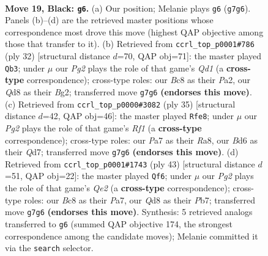 \documentclass[11pt]{article}
\begin{document}
\clearpage

\begin{figure}[p]\centering
\begin{subfigure}{0.46\textwidth}\centering
\resizebox{\linewidth}{!}{%
\newchessgame
\chessboard[
  setfen={r1bq1rk1/pp4pp/3b1p2/3p4/5n1P/1B1P1N2/PPPB1PP1/R2QR1K1 b - - 0 19},
  showmover=false,
  pgfstyle=straightmove, color=movearrow, markmove={g7-g6}
]}
\caption{}
\end{subfigure}\hfill
\begin{subfigure}{0.46\textwidth}\centering
\resizebox{\linewidth}{!}{%
\newchessgame
\chessboard[
  setfen={2rqr1k1/p4pp1/1b3n2/1p1pNb1p/3P4/4B1P1/PP3PBP/R2Q1RK1 w - - 0 17},
  showmover=false,
  pgfstyle=straightmove, color=movearrow, markmove={d1-b3}
]}
\caption{}
\end{subfigure}
\\[4pt]
\begin{subfigure}{0.46\textwidth}\centering
\resizebox{\linewidth}{!}{%
\newchessgame
\chessboard[
  setfen={r4rk1/1pbq2pp/p1n1bp2/3p4/B2P4/P1B2N1P/1P3PP1/2RQR1K1 b - - 0 18},
  showmover=false,
  pgfstyle=straightmove, color=movearrow, markmove={f8-e8}
]}
\caption{}
\end{subfigure}\hfill
\begin{subfigure}{0.46\textwidth}\centering
\resizebox{\linewidth}{!}{%
\newchessgame
\chessboard[
  setfen={r3r1k1/pp2qpbb/3p3p/2pPn3/2P2B2/2N4P/PP1QB1P1/2R2RK1 b - - 4 22},
  showmover=false,
  pgfstyle=straightmove, color=movearrow, markmove={e7-f6}
]}
\caption{}
\end{subfigure}
\caption{\textbf{Move 19, Black: \texttt{g6}.} (a) Our position; Melanie plays \texttt{g6} (\texttt{g7g6}). Panels (b)--(d) are the retrieved master positions whose correspondence most drove this move (highest QAP objective among those that transfer to it). (b) Retrieved from \texttt{ccrl\_top\_p0001\#786} (ply 32) [structural distance $d$=70, QAP obj=71]: the master played \texttt{Qb3}; under $\mu$ our \emph{Pg2} plays the role of that game's \emph{Qd1} (a \textbf{cross-type} correspondence); cross-type roles: our \emph{B}c8 as their \emph{P}a2, our \emph{Q}d8 as their \emph{B}g2; transferred move \texttt{g7g6} \textbf{(endorses this move)}. (c) Retrieved from \texttt{ccrl\_top\_p0000\#3082} (ply 35) [structural distance $d$=42, QAP obj=46]: the master played \texttt{Rfe8}; under $\mu$ our \emph{Pg2} plays the role of that game's \emph{Rf1} (a \textbf{cross-type} correspondence); cross-type roles: our \emph{P}a7 as their \emph{R}a8, our \emph{B}d6 as their \emph{Q}d7; transferred move \texttt{g7g6} \textbf{(endorses this move)}. (d) Retrieved from \texttt{ccrl\_top\_p0001\#1743} (ply 43) [structural distance $d$=51, QAP obj=22]: the master played \texttt{Qf6}; under $\mu$ our \emph{Pg2} plays the role of that game's \emph{Qe2} (a \textbf{cross-type} correspondence); cross-type roles: our \emph{B}c8 as their \emph{P}a7, our \emph{Q}d8 as their \emph{P}b7; transferred move \texttt{g7g6} \textbf{(endorses this move)}. Synthesis: 5 retrieved analogs transferred to \texttt{g6} (summed QAP objective 174, the strongest correspondence among the candidate moves); Melanie committed it via the \texttt{search} selector.}
\label{fig:thought-m37}
\end{figure}
\end{document}
